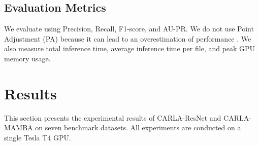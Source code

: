 \documentclass{svproc}
\begin{document}
\begin{table}[H]
\centering
\caption{Hyperparameter settings for CARLA-ResNet and CARLA-MAMBA. Each variant is independently tuned for its backbone. Window sizes differ between the two variants.}
\label{tab:hyperparams}
\end{table}

\subsection{Evaluation Metrics}

We evaluate using Precision, Recall, F1-score, and AU-PR. We do not use Point Adjustment (PA) because it can lead to an overestimation of performance \cite{kim2022towards}. We also measure total inference time, average inference time per file, and peak GPU memory usage.

\section{Results}
\label{sec:results}

This section presents the experimental results of CARLA-ResNet and CARLA-MAMBA on seven benchmark datasets. All experiments are conducted on a single Tesla T4 GPU.
\end{document}
